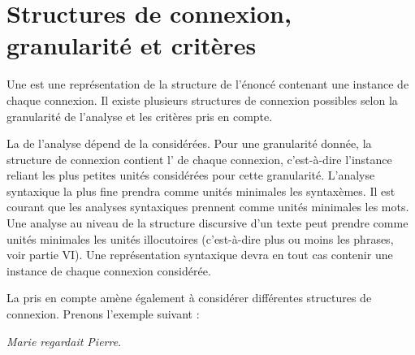 \section{Structures de connexion, granularité et critères}\label{sec:3.2.18}

Une  est une représentation de la structure de l’énoncé contenant une instance de chaque connexion. Il existe plusieurs structures de connexion possibles selon la granularité de l’analyse et les critères pris en compte.

La  de l’analyse dépend de la  considérées. Pour une granularité donnée, la structure de connexion contient l’ de chaque connexion, c’est-à-dire l’instance reliant les plus petites unités considérées pour cette granularité. L’analyse syntaxique la plus fine prendra comme unités minimales les syntaxèmes. Il est courant que les analyses syntaxiques prennent comme unités minimales les mots. Une analyse au niveau de la structure discursive d’un texte peut prendre comme unités minimales les unités illocutoires (c’est-à-dire plus ou moins les phrases, voir partie VI). Une représentation syntaxique devra en tout cas contenir une instance de chaque connexion considérée.

La  pris en compte amène également à considérer différentes structures de connexion. Prenons l’exemple suivant :

\ea \textit{Marie regardait Pierre}.\label{ex:regardait}\z

